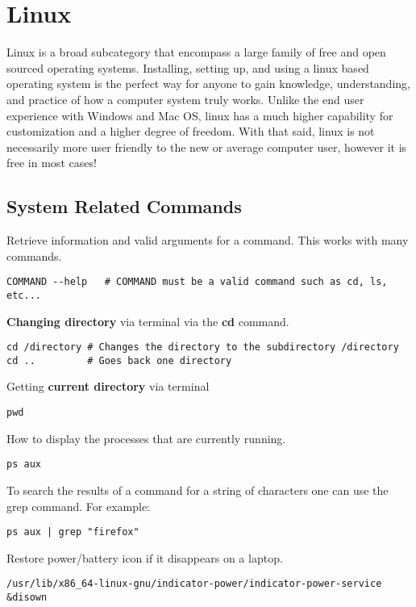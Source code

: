 \chapter{Linux}
\thispagestyle{fancy}
\lstset{language=Bash, style=bash}

Linux is a broad subcategory that encompass a large family of free and open sourced operating systems. Installing, setting up, and using a linux based operating system is the perfect way for anyone to gain knowledge, understanding, and practice of how a computer system truly works. Unlike the end user experience with Windows and Mac OS, linux has a much higher capability for customization and a higher degree of freedom. With that said, linux is not necessarily more user friendly to the new or average computer user, however it is free in most cases!

\section{System Related Commands}

Retrieve information and valid arguments for a command. This works with many commands.
\begin{lstlisting}
COMMAND --help   # COMMAND must be a valid command such as cd, ls, etc...
\end{lstlisting}

\textbf{Changing directory} via terminal via the \textbf{cd} command.
\begin{lstlisting}
cd /directory # Changes the directory to the subdirectory /directory
cd ..         # Goes back one directory
\end{lstlisting}

Getting \textbf{current directory} via terminal
\begin{lstlisting}
pwd
\end{lstlisting}

How to display the processes that are currently running.
\begin{lstlisting}
ps aux
\end{lstlisting}

To search the results of a command for a string of characters one can use the grep command. For example:
\begin{lstlisting}
ps aux | grep "firefox"
\end{lstlisting}

Restore power/battery icon if it disappears on a laptop.
\begin{lstlisting}
/usr/lib/x86_64-linux-gnu/indicator-power/indicator-power-service &disown 
\end{lstlisting}

